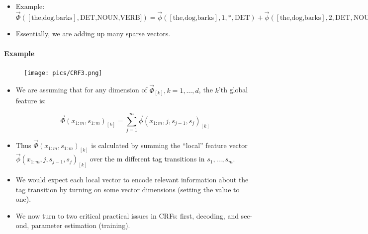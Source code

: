 \begin{itemize}
\begin{displaymath}
 \vec{\Phi}(x_{1:m},s_{1:m}) = \sum_{j=1}^{m} \vec{\phi}(x_{1:m},j,s_{j-1},s_j) 
\end{displaymath}

where $\vec{\phi}(x_{1:m},j,s_{j-1},s_j)$ are the same as the feature vectors used in MEMMs.

\item  Example: \ $ \vec{\Phi}([\text{the,dog,barks}],\text{DET,NOUN,VERB}]) = \vec{\phi}([\text{the,dog,barks}],1,*,\text{DET}) + \vec{\phi}([\text{the,dog,barks}],2,\text{DET},\text{NOUN}) + \vec{\phi}([\text{the,dog,barks}],3,\text{NOUN},\text{VERB})$

\item Essentially, we are adding up many sparse vectors.



\end{itemize}


\paragraph{Example}
  \begin{figure}[h]
        	\texttt{[image: pics/CRF3.png]}
        \end{figure}
        


\begin{itemize}
\item We are assuming that for any dimension of $\vec{\Phi}_{[k]}, k= 1, \dots, d$, the $k$'th global feature is:

\begin{displaymath}
 \vec{\Phi}(x_{1:m},s_{1:m})_{[k]} = \sum_{j=1}^{m} \vec{\phi}(x_{1:m},j,s_{j-1},s_j)_{[k]} 
\end{displaymath}

\item Thus $\vec{\Phi}(x_{1:m},s_{1:m})_{[k]}$ is calculated by summing the ``local'' feature vector $\vec{\phi}(x_{1:m},j,s_{j-1},s_j)_{[k]}$  over the m different tag transitions in $s_1,\dots,s_m$.


\item We would expect each local vector to encode relevant information about the tag transition by turning on some vector dimensions (setting the value to one).

\item We now turn to two critical practical issues in CRFs: first, decoding, and sec-
ond, parameter estimation (training).

\end{itemize}




